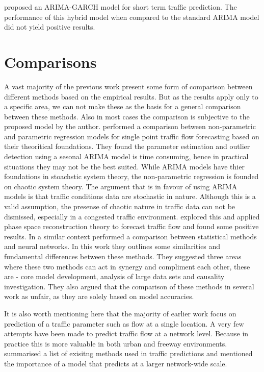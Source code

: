 \citet{chen2011short} proposed an ARIMA-GARCH model for short term traffic prediction. The
performance of this hybrid model when compared to the standard ARIMA model did not yield positive
results.


\section{Comparisons}
A vast majority of the previous work present some form of comparison between different methods based
on the empirical results. But as the results apply only to a specific area, we can not make these
as the basis for a general comparison between these methods. Also in most cases the comparison is
subjective to the proposed model by the author. \citet{smith2002comparison} performed
a comparison between non-parametric and parametric regression models for single point traffic flow
forecasting based on their theoritical foundations. They found the parameter estimation and outlier
detection using a sesonal ARIMA model is time consuming, hence in practical situations they may not be the
best suited. While ARIMA models have thier foundations in stoachstic system theory, the non-parametric
regression is founded on chaotic system theory. The argument that is in favour of using ARIMA models
is that traffic conditions data are stochastic in nature. Although this is a valid assumption, the
presense of chaotic nature in traffic data can not be dismissed, especially in a congested traffic
environment. \citet{hu2003applicable} explored this and applied phase space reconstruction theory to
forecast traffic flow and found some positive results. In a similar context \citet{karlaftis2011statistical}
performed a comparison between statistical methods and neural networks. In this work they outlines some
similarities and fundamental differences between these methods. They suggested three areas where these
two methods can act in synergy and compliment each other, these are - core model development, analysis
of large data sets and causality investigation. They also argued that the comparison of these methods in
several work as unfair, as they are solely based on model accuracies.

It is also worth mentioning here that the majority of earlier work focus on prediction of a traffic
parameter such as flow at a single location. A very few attempts have been made to predict traffic flow
at a network level. Because in practice this is more valuable in both urban and freeway environments.
\citet{van2007short} summarised a list of exisitng methods used in traffic predictions and mentioned
the importance of a model that predicts at a larger network-wide scale.

